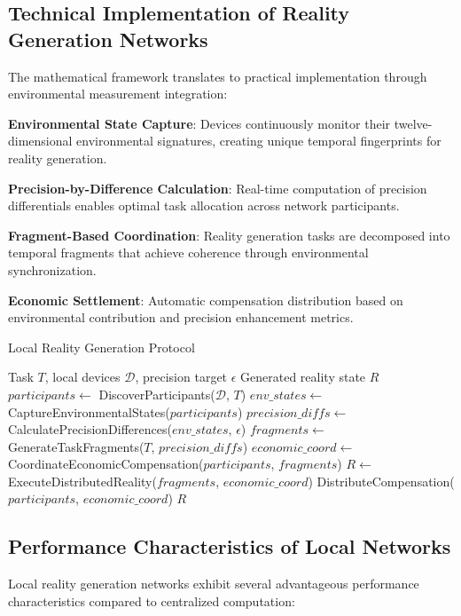 \documentclass[12pt]{article}
\begin{document}
\subsection{Technical Implementation of Reality Generation Networks}

The mathematical framework translates to practical implementation through environmental measurement integration:

\textbf{Environmental State Capture}: Devices continuously monitor their twelve-dimensional environmental signatures, creating unique temporal fingerprints for reality generation.

\textbf{Precision-by-Difference Calculation}: Real-time computation of precision differentials enables optimal task allocation across network participants.

\textbf{Fragment-Based Coordination}: Reality generation tasks are decomposed into temporal fragments that achieve coherence through environmental synchronization.

\textbf{Economic Settlement}: Automatic compensation distribution based on environmental contribution and precision enhancement metrics.

\begin{algorithm}
\caption{Local Reality Generation Protocol}
\begin{algorithmic}[1]
\Require Task $T$, local devices $\mathcal{D}$, precision target $\epsilon$
\Ensure Generated reality state $R$
\State $participants \leftarrow$ DiscoverParticipants($\mathcal{D}$, $T$)
\State $env\_states \leftarrow$ CaptureEnvironmentalStates($participants$)
\State $precision\_diffs \leftarrow$ CalculatePrecisionDifferences($env\_states$, $\epsilon$)
\State $fragments \leftarrow$ GenerateTaskFragments($T$, $precision\_diffs$)
\State $economic\_coord \leftarrow$ CoordinateEconomicCompensation($participants$, $fragments$)
\State $R \leftarrow$ ExecuteDistributedReality($fragments$, $economic\_coord$)
\State DistributeCompensation($participants$, $economic\_coord$)
\State \Return $R$
\end{algorithmic}
\end{algorithm}

\subsection{Performance Characteristics of Local Networks}

Local reality generation networks exhibit several advantageous performance characteristics compared to centralized computation:
\end{document}
